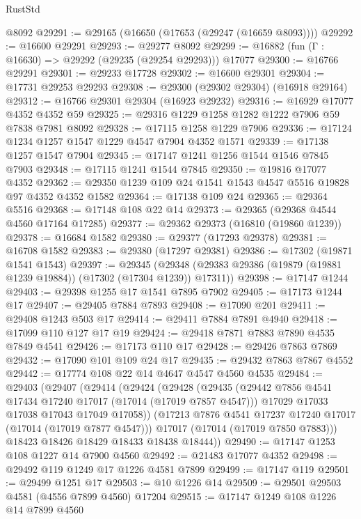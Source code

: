 \begin{lexlean}{RustStd}
\begin{coremodule}
    @8092
@29291 := @29165 (@16650 (@17653 (@29247 (@16659 @8093))))
@29292 := @16600 @29291
@29293 := @29277 @8092
@29299 := @16882 (fun (Γ : @16630) => @29292 (@29235 (@29254 @29293))) @17077
@29300 := @16766 @29291
@29301 := @29233 @17728
@29302 := @16600 @29301
@29304 := @17731 @29253 @29293
@29308 := @29300 (@29302 @29304) (@16918 @29164)
@29312 := @16766 @29301 @29304 (@16923 @29232)
@29316 := @16929 @17077 @4352 @4352 @59
@29325 := @29316 @1229 @1258 @1282 @1222 @7906 @59 @7838 @7981 @8092
@29328 := @17115 @1258 @1229 @7906
@29336 := @17124 @1234 @1257 @1547 @1229 @4547 @7904 @4352 @1571
@29339 := @17138 @1257 @1547 @7904
@29345 := @17147 @1241 @1256 @1544 @1546 @7845 @7903
@29348 := @17115 @1241 @1544 @7845
@29350 := @19816 @17077 @4352
@29362 := @29350 @1239 @109 @24 @1541 @1543 @4547 @5516 @19828 @97 @4352 @4352 @1582
@29364 := @17138 @109 @24
@29365 := @29364 @5516
@29368 := @17148 @108 @22 @14
@29373 := @29365 (@29368 @4544 @4560 @17164 @17285)
@29377 := @29362 @29373 (@16810 (@19860 @1239))
@29378 := @16684 @1582
@29380 := @29377 (@17293 @29378)
@29381 := @16708 @1582
@29383 := @29380 (@17297 @29381)
@29386 := @17302 (@19871 @1541 @1543)
@29397 := @29345
    (@29348 (@29383 @29386 (@19879 (@19881 @1239 @19884)) (@17302 (@17304 @1239)) @17311))
@29398 := @17147 @1244
@29403 := @29398 @1255 @17 @1541 @7895 @7902
@29405 := @17173 @1244 @17
@29407 := @29405 @7884 @7893
@29408 := @17090 @201
@29411 := @29408 @1243 @503 @17
@29414 := @29411 @7884 @7891 @4940
@29418 := @17099 @110 @127 @17 @19
@29424 := @29418 @7871 @7883 @7890 @4535 @7849 @4541
@29426 := @17173 @110 @17
@29428 := @29426 @7863 @7869
@29432 := @17090 @101 @109 @24 @17
@29435 := @29432 @7863 @7867 @4552
@29442 := @17774 @108 @22 @14 @4647 @4547 @4560 @4535
@29484 := @29403
    (@29407
      (@29414
        (@29424
          (@29428
            (@29435
              (@29442 @7856 @4541 @17434 @17240 @17017 (@17014 (@17019 @7857 @4547)))
              @17029
              @17033
              @17038
              @17043
              @17049
              @17058))
          (@17213 @7876 @4541 @17237 @17240 @17017 (@17014 (@17019 @7877 @4547)))
          @17017
          (@17014 (@17019 @7850 @7883)))
        @18423
        @18426
        @18429
        @18433
        @18438
        @18444))
@29490 := @17147 @1253 @108 @1227 @14 @7900 @4560
@29492 := @21483 @17077 @4352
@29498 := @29492 @119 @1249 @17 @1226 @4581 @7899
@29499 := @17147 @119
@29501 := @29499 @1251 @17
@29503 := @10 @1226 @14
@29509 := @29501 @29503 @4581 (@4556 @7899 @4560) @17204
@29515 := @17147 @1249 @108 @1226 @14 @7899 @4560

\end{coremodule}
\end{lexlean}
